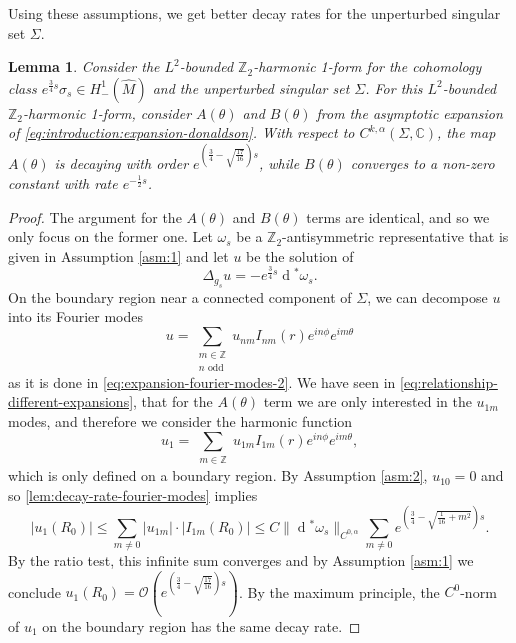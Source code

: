 \documentclass[preprint,12pt]{elsarticle}
\numberwithin{table}{section}
\newtheorem{lemma}{Lemma}[section]
\newcommand{\Z}{\mathbb{Z}}
\newcommand{\C}{\mathbb{C}}
\renewcommand{\d}{\operatorname{d}\!}
\renewcommand{\O}{\mathcal{O}}
\begin{document}
Using these assumptions, we get better decay rates for the unperturbed singular set $\Sigma$.
\begin{lemma}
	\label{lem:Nash-Moser:better-estimates}
	Consider  the $L^2$-bounded $\Z_2$-harmonic 1-form for the cohomology class $e^{\frac{3}{4} s} \sigma_s \in H^1_-(\hat{M})$ and the unperturbed singular set $\Sigma$. For this $L^2$-bounded $\Z_2$-harmonic 1-form, consider $A(\theta)$ and $B(\theta)$ from the asymptotic expansion of \cref{eq:introduction:expansion-donaldson}. With respect to $C^{k, \alpha}(\Sigma, \C)$, the map $A(\theta)$ is decaying with order $e^{(\frac{3}{4} - \sqrt{\frac{17}{16}})s}$, while $B(\theta)$ converges to a non-zero constant with rate $e^{-\frac{1}{2}s}$.
\end{lemma}
\begin{proof}
	
	The argument for the $A(\theta)$ and $B(\theta)$ terms are identical, and so we only focus on the former one.
	Let $\omega_s$ be a $\Z_2$-antisymmetric representative that is given in Assumption \ref{asm:1} and let $u$ be the solution of
	$$
	\Delta_{g_s} u = - e^{\frac{3}{4}s} \d^* \omega_s.
	$$
	On the boundary region near a connected component of $\Sigma$, we can decompose $u$ into its Fourier modes 
	\begin{equation}
		u = \sum_{\substack{m \in \Z \\ n \text{ odd}}} u_{nm} I_{nm}(r) e^{in \phi} e^{im \theta}
	\end{equation}
	as it is done in \cref{eq:expansion-fourier-modes-2}.
	We have seen in \cref{eq:relationship-different-expansions}, that for the $A(\theta)$ term we are only interested in the $u_{1m}$ modes, and therefore we consider the harmonic function
	$$
	u_1 = \sum_{\substack{m \in \Z}} u_{1m} I_{1m}(r) e^{in \phi} e^{im \theta},
	$$
	which is only defined on a boundary region. By Assumption \ref{asm:2}, $u_{10} = 0$ and so \cref{lem:decay-rate-fourier-modes} implies
	$$
	|u_1(R_0)| \le \sum_{m \not = 0} |u_{1m}| \cdot |I_{1m}(R_0)| \le C \|\d^*\omega_s \|_{C^{0, \alpha}} \sum_{m \not = 0} e^{(\frac{3}{4} - \sqrt{\frac{1}{16} + m^2})s}.
	$$
	By the ratio test, this infinite sum converges and by Assumption \ref{asm:1} we conclude $u_1(R_0) = \O\left(e^{(\frac{3}{4} - \sqrt{\frac{17}{16}})s}\right)$.
	By the maximum principle, the $C^0$-norm of $u_1$ on the boundary region has the same decay rate. 


\end{proof}
\end{document}
